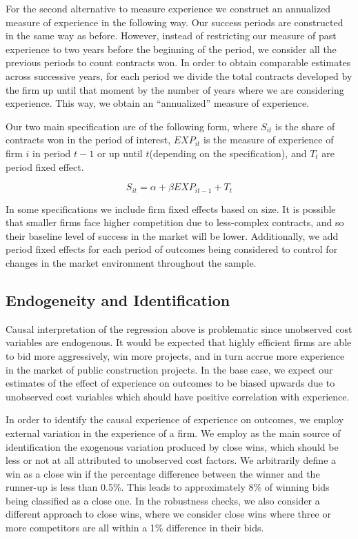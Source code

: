 For the second alternative to measure experience we construct an annualized measure of experience in the following way. Our success periods are constructed in the same way as before. However, instead of restricting our measure of past experience to two years before the beginning of the period, we consider all the previous periods to count contracts won. In order to obtain comparable estimates across successive years, for each period we divide the total contracts developed by the firm up until that moment by the number of years where we are considering experience. This way, we obtain an “annualized” measure of experience.

Our two main specification are of the following form, where $S_{it }$ is the share of contracts won in the period of interest, $EXP_{it} $ is the measure of experience of firm $i$ in period $t-1$ or up until $t$(depending on the specification), and $T_t$ are period fixed effect.

$$S_{it}=\alpha+ \beta EXP_{it-1}+T_t$$

In some specifications we include firm fixed effects based on size. It is possible that smaller firms face higher competition due to less-complex contracts, and so their baseline level of success in the market will be lower. Additionally, we add period  fixed effects for each period of outcomes being considered to control for changes in the market environment throughout the sample.

\subsection{Endogeneity and Identification}
Causal interpretation of the regression above is problematic since unobserved cost variables are endogenous. It would be expected that highly efficient firms are able to bid more aggressively, win more projects, and in turn accrue more experience in the market of public construction projects. In the base case, we expect our estimates of the effect of experience on outcomes to be biased upwards due to unobserved cost variables which should have positive correlation with experience.

In order to identify the causal experience of experience on outcomes, we employ external variation in the experience of a firm. We employ as the main source of identification the exogenous variation produced by close wins, which should be less or not at all attributed to unobserved cost factors. We arbitrarily define a win as a close win if the percentage difference between the winner and the runner-up is less than 0.5\%. This leads to approximately 8\% of winning bids being classified as a close one.  In the robustness checks, we also consider a different approach to close wins, where we consider close wins where three or more competitors are all within a 1\% difference in their bids.

